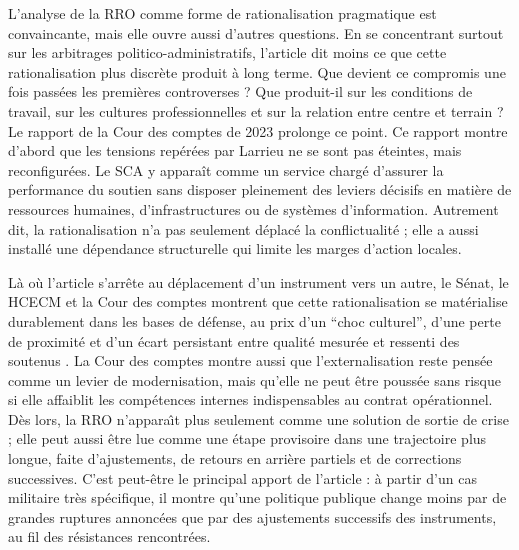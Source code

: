 \documentclass[12pt,a4paper]{article}
\begin{document}
L'analyse de la RRO comme forme de rationalisation pragmatique est convaincante, mais elle ouvre aussi d'autres questions. En se concentrant surtout sur les arbitrages politico-administratifs, l'article dit moins ce que cette rationalisation plus discr\`ete produit \`a long terme. Que devient ce compromis une fois pass\'ees les premi\`eres controverses ? Que produit-il sur les conditions de travail, sur les cultures professionnelles et sur la relation entre centre et terrain ? Le rapport de la Cour des comptes de 2023 \parencite{CourDesComptes2023SCA} prolonge ce point. Ce rapport montre d'abord que les tensions rep\'er\'ees par Larrieu ne se sont pas \'eteintes, mais reconfigur\'ees. Le SCA y appara\^it comme un service charg\'e d'assurer la performance du soutien sans disposer pleinement des leviers d\'ecisifs en mati\`ere de ressources humaines, d'infrastructures ou de syst\`emes d'information. Autrement dit, la rationalisation n'a pas seulement d\'eplac\'e la conflictualit\'e ; elle a aussi install\'e une d\'ependance structurelle qui limite les marges d'action locales.

L\`a o\`u l'article s'arr\^ete au d\'eplacement d'un instrument vers un autre, le S\'enat, le HCECM et la Cour des comptes montrent que cette rationalisation se mat\'erialise durablement dans les bases de d\'efense, au prix d'un ``choc culturel'', d'une perte de proximit\'e et d'un \'ecart persistant entre qualit\'e mesur\'ee et ressenti des soutenus \parencites[pp.~61,~69]{RogerDulait2012BasesDefense}[pp.~63--64]{HCECM2014AdministrationMilitaires}[p.~19]{CourDesComptes2023SCA}. La Cour des comptes montre aussi que l'externalisation reste pens\'ee comme un levier de modernisation, mais qu'elle ne peut \^etre pouss\'ee sans risque si elle affaiblit les comp\'etences internes indispensables au contrat op\'erationnel. D\`es lors, la RRO n'appara\^\i t plus seulement comme une solution de sortie de crise ; elle peut aussi \^etre lue comme une \'etape provisoire dans une trajectoire plus longue, faite d'ajustements, de retours en arri\`ere partiels et de corrections successives. C'est peut-\^etre le principal apport de l'article : \`a partir d'un cas militaire tr\`es sp\'ecifique, il montre qu'une politique publique change moins par de grandes ruptures annonc\'ees que par des ajustements successifs des instruments, au fil des r\'esistances rencontr\'ees.
\end{document}
